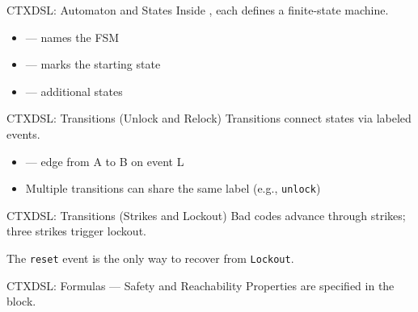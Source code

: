 \begin{frame}[fragile]{CTXDSL: Automaton and States}
  Inside , each  defines a finite-state machine.

  \bigskip
  

  \bigskip
  \begin{itemize}
    \item {} --- names the FSM
    \item {} --- marks the starting state
    \item {} --- additional states
  \end{itemize}
\end{frame}

\begin{frame}[fragile]{CTXDSL: Transitions (Unlock and Relock)}
  Transitions connect states via labeled events.

  \bigskip
  

  \bigskip
  \begin{itemize}
    \item {} --- edge from A to B on event L
    \item Multiple transitions can share the same label (e.g., \texttt{unlock})
  \end{itemize}
\end{frame}

\begin{frame}[fragile]{CTXDSL: Transitions (Strikes and Lockout)}
  Bad codes advance through strikes; three strikes trigger lockout.

  \bigskip
  

  \bigskip
  The \texttt{reset} event is the only way to recover from \texttt{Lockout}.
\end{frame}

\begin{frame}[fragile]{CTXDSL: Formulas --- Safety and Reachability}
  Properties are specified in the  block.

  \bigskip
  

\end{frame}

